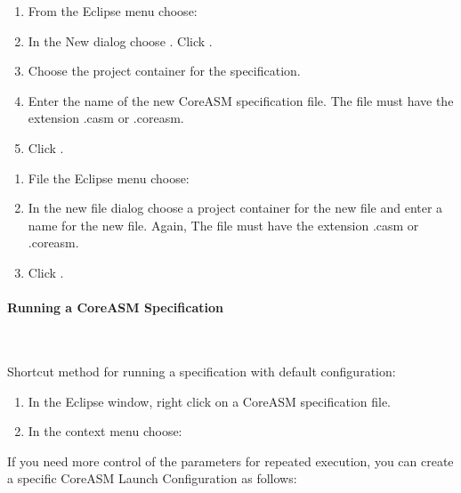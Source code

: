 \documentclass{article}
\newcommand{\CoreASM}{{\sffamily CoreASM}\xspace}
\begin{document}

\begin{enumerate}
	\item From the Eclipse menu choose: 
	\item In the New dialog choose . Click .
    \item Choose the project container for the specification.
    \item Enter the name of the new \CoreASM specification file. The file must have the extension {\ttfamily .casm} or {\ttfamily .coreasm}. 
	\item Click . 
\end{enumerate}


\begin{enumerate}
    \item File the Eclipse menu choose: 
    \item In the new file dialog choose a project container for the new file and enter a name for the new file. Again, The file must have the extension {\ttfamily .casm} or {\ttfamily .coreasm}.
    \item Click . 
\end{enumerate}

\paragraph{Running a \CoreASM Specification} ~


Shortcut method for running a specification with default configuration:

\begin{enumerate}
    \item In the Eclipse window, right click on a \CoreASM specification file.
    \item In the context menu choose:  
\end{enumerate}


If you need more control of the parameters for repeated execution, 
you can create a specific \CoreASM Launch Configuration as follows:
\end{document}
